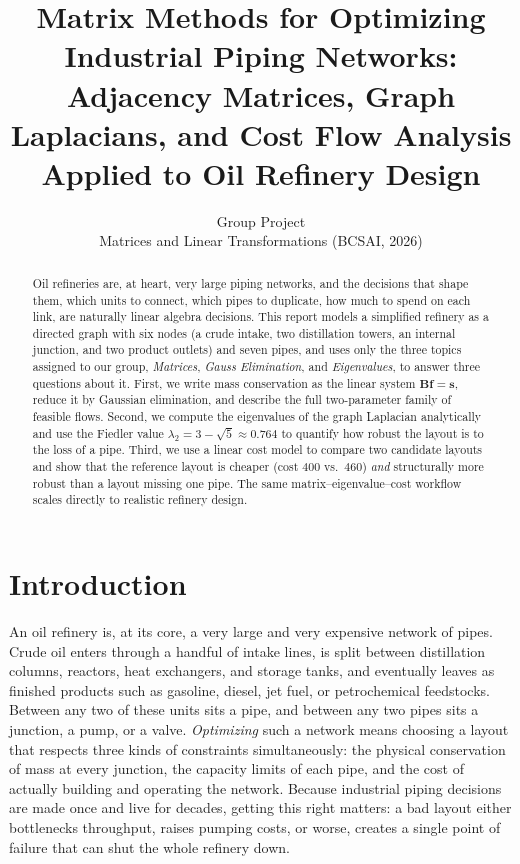 \documentclass[11pt,a4paper]{article}
\title{Matrix Methods for Optimizing Industrial Piping Networks:\\
Adjacency Matrices, Graph Laplacians, and Cost Flow Analysis\\
Applied to Oil Refinery Design}
\author{Group Project \\ Matrices and Linear Transformations (BCSAI, 2026)}
\date{}
\newcommand{\mat}[1]{\mathbf{#1}}
\newcommand{\vect}[1]{\mathbf{#1}}
\begin{document}
\maketitle

\begin{abstract}
Oil refineries are, at heart, very large piping networks, and the
decisions that shape them, which units to connect, which pipes to
duplicate, how much to spend on each link, are naturally linear
algebra decisions. This report models a simplified refinery as a
directed graph with six nodes (a crude intake, two distillation
towers, an internal junction, and two product outlets) and seven
pipes, and uses only the three topics assigned to our group,
\emph{Matrices}, \emph{Gauss Elimination}, and \emph{Eigenvalues}, to
answer three questions about it. First, we write mass conservation
as the linear system $\mat{B}\vect{f}=\vect{s}$, reduce it by
Gaussian elimination, and describe the full two-parameter family of
feasible flows. Second, we compute the eigenvalues of the graph
Laplacian analytically and use the Fiedler value $\lambda_2 =
3-\sqrt{5} \approx 0.764$ to quantify how robust the layout is to
the loss of a pipe. Third, we use a linear cost model to compare two
candidate layouts and show that the reference layout is cheaper (cost
$400$ vs.\ $460$) \emph{and} structurally more robust than a layout
missing one pipe. The same matrix--eigenvalue--cost workflow scales
directly to realistic refinery design.
\end{abstract}

\section{Introduction}
\label{sec:introduction}

An oil refinery is, at its core, a very large and very expensive network
of pipes. Crude oil enters through a handful of intake lines, is split
between distillation columns, reactors, heat exchangers, and storage
tanks, and eventually leaves as finished products such as gasoline,
diesel, jet fuel, or petrochemical feedstocks. Between any two of these
units sits a pipe, and between any two pipes sits a junction, a pump, or
a valve. \emph{Optimizing} such a network means choosing a layout that
respects three kinds of constraints simultaneously: the physical
conservation of mass at every junction, the capacity limits of each
pipe, and the cost of actually building and operating the network.
Because industrial piping decisions are made once and live for decades,
getting this right matters: a bad layout either bottlenecks throughput,
raises pumping costs, or worse, creates a single point of failure that
can shut the whole refinery down.
\end{document}
